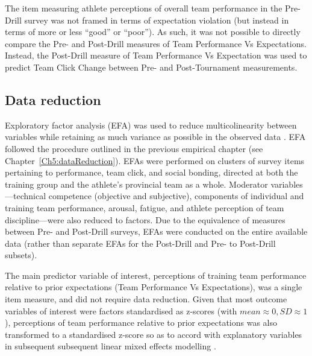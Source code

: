 \begin{CJK}{UTF8}{gbsn}
 The item measuring athlete perceptions of overall team performance in the Pre-Drill survey was not framed in terms of expectation violation (but instead in terms of more or less ``good'' or ``poor'').  As such, it was not possible to directly compare the Pre- and Post-Drill measures of Team Performance Vs Expectations.  Instead, the Post-Drill measure of Team Performance Vs Expectation was used to predict Team Click Change between Pre- and Post-Tournament measurements.




\subsection{Data reduction}
Exploratory factor analysis (EFA) was used to reduce multicolinearity between variables while retaining as much variance as possible in the observed data \citep[see Appendix~\ref{app8:EFA}]{Yong2013}. EFA followed the procedure outlined in the previous empirical chapter (see Chapter~\ref{Ch5:dataReduction}).
EFAs were performed on clusters of survey items pertaining to performance, team click, and social bonding, directed at both the training group and the athlete's provincial team as a whole.  Moderator variables---technical competence (objective and subjective), components of individual and training team performance, arousal, fatigue, and athlete perception of team discipline---were also reduced to factors. Due to the equivalence of measures between Pre- and Post-Drill surveys, EFAs were conducted on the entire available data (rather than separate EFAs for the Post-Drill and Pre- to Post-Drill subsets).




The main predictor variable of interest, perceptions of training team performance relative to prior expectations (Team Performance Vs Expectations), was a single item measure, and did not require data reduction.  Given that most outcome variables of interest were factors standardised as z-scores (with $mean \approx 0, SD \approx 1$), perceptions of team performance relative to prior expectations was also transformed to a standardised z-score so as to accord with explanatory variables in subsequent subsequent linear mixed effects modelling \citep[for an explanation, see][1058]{Beckmann2003}.



\end{CJK}
